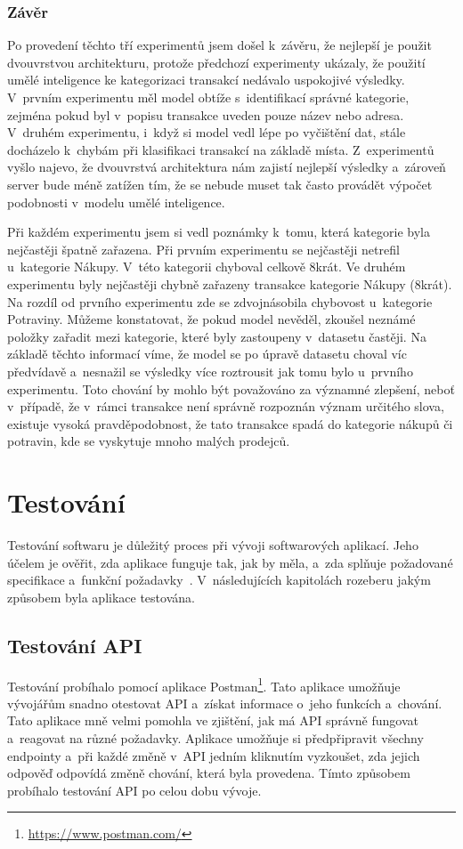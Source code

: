 \subsection{Závěr}
Po provedení těchto tří experimentů jsem došel k~závěru, že nejlepší je použit dvouvrstvou architekturu, protože předchozí experimenty ukázaly, že použití umělé inteligence ke kategorizaci transakcí nedávalo uspokojivé výsledky. V~prvním experimentu měl model obtíže s~identifikací správné kategorie, zejména pokud byl v~popisu transakce uveden pouze název nebo adresa. V~druhém experimentu, i~když si model vedl lépe po vyčištění dat, stále docházelo k~chybám při klasifikaci transakcí na základě místa. Z~experimentů vyšlo najevo, že dvouvrstvá architektura nám zajistí nejlepší výsledky a~zároveň server bude méně zatížen tím, že se nebude muset tak často provádět výpočet podobnosti v~modelu umělé inteligence.

Při každém experimentu jsem si vedl poznámky k~tomu, která kategorie byla nejčastěji špatně zařazena. Při prvním experimentu se nejčastěji netrefil u~kategorie Nákupy. V~této kategorii chyboval celkově 8krát. Ve druhém experimentu byly nejčastěji chybně zařazeny transakce kategorie Nákupy (8krát). Na rozdíl od prvního experimentu zde se zdvojnásobila chybovost u~kategorie Potraviny. Můžeme konstatovat, že pokud model nevěděl, zkoušel neznámé položky zařadit mezi kategorie, které byly zastoupeny v~datasetu častěji. Na základě těchto informací víme, že model se po úpravě datasetu choval víc předvídavě a~nesnažil se výsledky více roztrousit jak tomu bylo u~prvního experimentu. Toto chování by mohlo být považováno za významné zlepšení, neboť v~případě, že v~rámci transakce není správně rozpoznán význam určitého slova, existuje vysoká pravděpodobnost, že tato transakce spadá do kategorie nákupů či potravin, kde se vyskytuje mnoho malých prodejců.
    
\chapter{Testování}
Testování softwaru je důležitý proces při vývoji softwarových aplikací. Jeho účelem je ověřit, zda aplikace funguje tak, jak by měla, a~zda splňuje požadované specifikace a~funkční požadavky~\cite{singh2012software}. V~následujících kapitolách rozeberu jakým způsobem byla aplikace testována.
\section{Testování API}
Testování probíhalo pomocí aplikace Postman\footnote{\url{https://www.postman.com/}}. Tato aplikace umožňuje vývojářům snadno otestovat API a~získat informace o~jeho funkcích a~chování. Tato aplikace mně velmi pomohla ve zjištění, jak má API správně fungovat a~reagovat na různé požadavky. Aplikace umožňuje si předpřipravit všechny endpointy a~při každé změně v~API jedním kliknutím vyzkoušet, zda jejich odpověď odpovídá změně chování, která byla provedena. Tímto způsobem probíhalo testování API po celou dobu vývoje.
